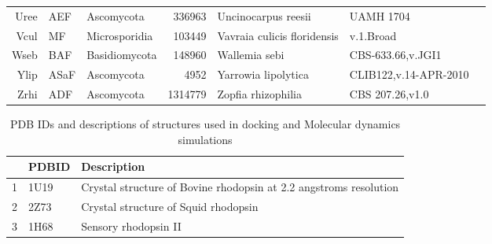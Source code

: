 {{{\begin{longtable}{rllrlll}
  Uree & AEF & Ascomycota & 336963 & Uncinocarpus reesii & UAMH 1704 & \cite{Uree} \\ 
  Vcul & MF & Microsporidia & 103449 & Vavraia culicis floridensis & v.1.Broad & \cite{Vcul} \\ 
  Wseb & BAF & Basidiomycota & 148960 & Wallemia sebi & CBS-633.66,v.JGI1 & \cite{Wseb} \\ 
  Ylip & ASaF & Ascomycota & 4952 & Yarrowia lipolytica & CLIB122,v.14-APR-2010 & \cite{Ylip} \\ 
  Zrhi & ADF & Ascomycota & 1314779 & Zopfia rhizophilia & CBS 207.26,v1.0 & \cite{Zrhi} \\ 
   \hline
\hline
\end{longtable}
} %
} %
} %
\begin{table}[h]
\centering
\caption[PDB IDs and descriptions of structures used in comparative analyses]{PDB IDs and descriptions of structures used in docking and Molecular dynamics simulations} 
\label{tab:AppData_PDB}
\begin{tabular}{rll}
  \hline
\hline
 & PDBID & Description \\ 
  \hline
1 & 1U19 & Crystal structure of Bovine rhodopsin at 2.2 angstroms resolution \\ 
  2 & 2Z73 & Crystal structure of Squid rhodopsin \\ 
  3 & 1H68 & Sensory rhodopsin II \\ 
   \hline
\hline
\end{tabular}
\end{table}
